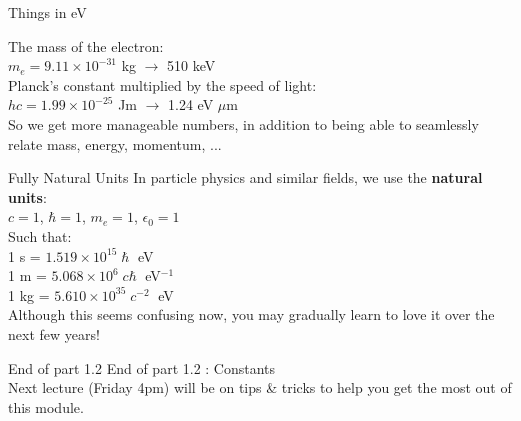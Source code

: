\begin{frame}{ Things in eV}

The mass of the electron:\\[2ex]
$m_e = 9.11\times10^{-31}$ kg $\rightarrow$ 510  keV\\[3ex]

Planck's constant multiplied by the speed of light:\\[2ex]
$hc = 1.99 \times10^{-25}$ Jm $\rightarrow $ 1.24 eV $\mu$m  \\[3ex]

So we get more manageable numbers, in addition to being able to seamlessly relate mass, energy, momentum, ...\\[3ex]

\end{frame}


\begin{frame}{ Fully Natural Units}
\small
In particle physics and similar fields, we use the \textbf{natural units}:\\

$c = 1$, $\hbar = 1$, $m_e = 1$, $\epsilon_0 = 1$\\[1ex]

Such that:\\[1ex]

1 s = $1.519 \times 10^{15}\; \hbar\;$ eV\\[1ex]
1 m = $5.068 \times 10^{6}\; c \hbar\;$ eV$^{-1}$\\[1ex]
1 kg = $5.610 \times 10^{35}\; c^{-2}\;$ eV\\[1ex]

Although this seems confusing now, you may gradually learn to love it over the next few years!
\end{frame}

 \begin{frame}{End of part 1.2}
End of part 1.2 : Constants\\[1ex]
Next lecture (Friday 4pm) will be on tips \& tricks to help you get the most out of this module.\\
\end{frame}
 
 
 

 
 
 
